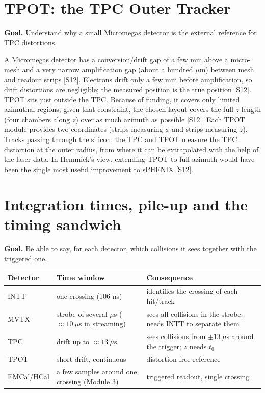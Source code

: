 \documentclass[11pt,letterpaper]{article}
\newcommand{\goal}[1]{\par\noindent\textbf{Goal.} #1\par\smallskip}
\begin{document}
\section{TPOT: the TPC Outer Tracker}\label{sec:tpot}
\goal{Understand why a small Micromegas detector is the external reference for TPC distortions.}

A Micromegas detector has a conversion/drift gap of a few mm above a micro-mesh and a very narrow amplification gap (about a hundred $\mu$m) between mesh and readout strips [S12].
Electrons drift only a few mm before amplification, so drift distortions are negligible; the measured position is the true position [S12].
TPOT sits just outside the TPC.
Because of funding, it covers only limited azimuthal regions; given that constraint, the chosen layout covers the full $z$ length (four chambers along $z$) over as much azimuth as possible [S12].
Each TPOT module provides two coordinates (strips measuring $\phi$ and strips measuring $z$).
Tracks passing through the silicon, the TPC and TPOT measure the TPC distortion at the outer radius, from where it can be extrapolated with the help of the laser data.
In Hemmick's view, extending TPOT to full azimuth would have been the single most useful improvement to sPHENIX [S12].

\section{Integration times, pile-up and the timing sandwich}\label{sec:timing}
\goal{Be able to say, for each detector, which collisions it sees together with the triggered one.}

\begin{center}\small
\begin{tabularx}{\linewidth}{@{}lXX@{}}\toprule
Detector & Time window & Consequence\\\midrule
INTT & one crossing (106 ns) & identifies the crossing of each hit/track\\
MVTX & strobe of several $\mu$s ($\approx10\ \mu$s in streaming) & sees all collisions in the strobe; needs INTT to separate them\\
TPC & drift up to $\approx13\ \mu$s & sees collisions from $\pm13\ \mu$s around the trigger; $z$ needs $t_0$\\
TPOT & short drift, continuous & distortion-free reference\\
EMCal/HCal & a few samples around one crossing (Module 3) & triggered readout, single crossing\\\bottomrule
\end{tabularx}\end{center}
\end{document}
